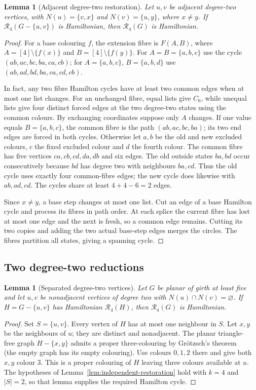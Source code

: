 \documentclass[11pt]{article}
\newtheorem{lemma}[theorem]{Lemma}
\theoremstyle{remark}
\newcommand{\R}{\mathcal R}
\numberwithin{equation}{section}
\numberwithin{table}{section}
\begin{document}
\begin{lemma}[Adjacent degree-two restoration]
\label{lem:adjacent-two-four}
Let $u,v$ be adjacent degree-two vertices, with
$N(u)=\{v,x\}$ and $N(v)=\{u,y\}$, where $x\ne y$.  If
$\R_4(G-\{u,v\})$ is Hamiltonian, then $\R_4(G)$ is Hamiltonian.
\end{lemma}
\begin{proof}
For a base colouring $f$, the extension fibre is $F(A,B)$, where
$A=[4]\setminus\{f(x)\}$ and $B=[4]\setminus\{f(y)\}$.
For $A=B=\{a,b,c\}$ use the cycle $(ab,ac,bc,ba,ca,cb)$;
for $A=\{a,b,c\}$, $B=\{a,b,d\}$ use
$(ab,ad,bd,ba,ca,cd,cb)$.

In fact, any two fibre Hamilton cycles have at least two common
edges when at most one list changes. For an unchanged fibre, equal
lists give $C_6$, while unequal lists give four distinct forced
edges at the two degree-two states using the common colours.
By exchanging coordinates suppose only $A$ changes. If one value
equals $B=\{a,b,c\}$, the common fibre is the path
$(ab,ac,bc,ba)$; its two end edges are forced in both cycles.
Otherwise let $a,b$ be the old and new excluded colours, $c$ the
fixed excluded colour and $d$ the fourth colour. The common fibre
has five vertices $ca,cb,cd,da,db$ and six edges. The old outside
states $ba,bd$ occur consecutively because $bd$ has degree two
with neighbours $ba,cd$. Thus the old cycle uses exactly four
common-fibre edges; the new cycle does likewise with $ab,ad,cd$.
The cycles share at least $4+4-6=2$ edges.

Since $x\ne y$, a base step changes at most one list. Cut an edge
of a base Hamilton cycle and process its fibres in path order.
At each splice the current fibre has lost at most one edge and the
next is fresh, so a common edge remains. Cutting its two copies
and adding the two actual base-step edges merges the circles.
The fibres partition all states, giving a spanning cycle.
\end{proof}

\subsection{Two degree-two reductions}
\begin{lemma}[Separated degree-two vertices]\label{lem:separated-two-g5}
Let $G$ be planar of girth at least five and let $u,v$ be nonadjacent
vertices of degree two with $N(u)\cap N(v)=\varnothing$.  If
$H=G-\{u,v\}$ has Hamiltonian $\R_4(H)$, then $\R_4(G)$ is Hamiltonian.
\end{lemma}
\begin{proof}
Set $S=\{u,v\}$.  Every vertex of $H$ has at most one neighbour in $S$.
Let $x,y$ be the neighbours of $u$; they are distinct and nonadjacent.
The planar triangle-free graph $H-\{x,y\}$ admits a proper three-colouring
by Gr\"otzsch's theorem~\cite{Grotzsch59} (the empty graph has its empty
colouring).  Use colours $0,1,2$ there and give both $x,y$ colour $3$.
This is a proper colouring of $H$ leaving three colours available at $u$.
The hypotheses of Lemma~\ref{lem:independent-restoration} hold with
$k=4$ and $|S|=2$, so that lemma supplies the required Hamilton cycle.
\end{proof}
\end{document}
